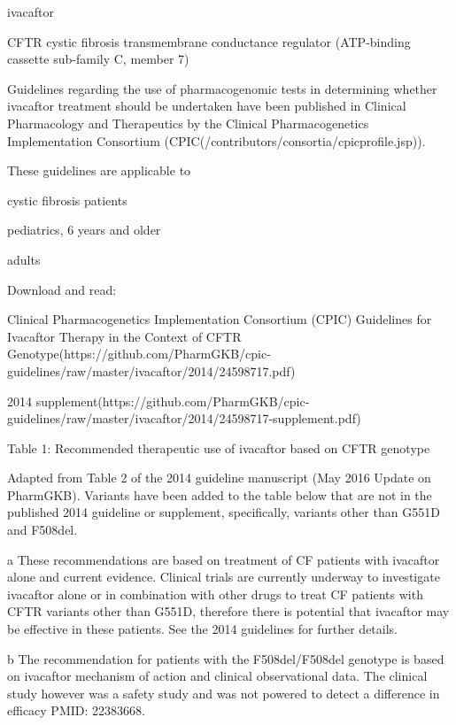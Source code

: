 \documentclass{resume} %
\begin{document}
\begin{rSection}{ ivacaftor }
\begin{rSubsection}{ CFTR }{ cystic fibrosis transmembrane conductance regulator (ATP-binding cassette sub-family C, member 7) }{}{}
 \newline
\item Guidelines regarding the use of pharmacogenomic tests in determining whether ivacaftor treatment should be undertaken have been published in Clinical Pharmacology and Therapeutics by the Clinical Pharmacogenetics Implementation Consortium (CPIC(/contributors/consortia/cpicprofile.jsp)). 
 \newline
\item These guidelines are applicable to 
 \newline
\item cystic fibrosis patients
 \newline
\item pediatrics, 6 years and older
 \newline
\item adults
 \newline
\item Download and read:
 \newline
\item Clinical Pharmacogenetics Implementation Consortium (CPIC) Guidelines for Ivacaftor Therapy in the Context of CFTR Genotype(https://github.com/PharmGKB/cpic-guidelines/raw/master/ivacaftor/2014/24598717.pdf) 
 \newline
\item 2014 supplement(https://github.com/PharmGKB/cpic-guidelines/raw/master/ivacaftor/2014/24598717-supplement.pdf)
 \newline
\item Table 1: Recommended therapeutic use of ivacaftor based on CFTR genotype
 \newline
\item Adapted from Table 2 of the 2014 guideline manuscript (May 2016 Update on PharmGKB).  Variants have been added to the table below that are not in the published 2014 guideline or supplement,  specifically, variants other than G551D and F508del.
 \newline
\item a These recommendations are based on treatment of CF patients with ivacaftor alone and current evidence. Clinical trials are currently underway to investigate ivacaftor alone or in combination with other drugs to treat CF patients with CFTR variants other than G551D, therefore there is potential that ivacaftor may be effective in these patients. See the 2014 guidelines for further details.
 \newline
\item b The recommendation for patients with the F508del/F508del genotype is based on ivacaftor mechanism of action and clinical observational data. The clinical study however was a safety study and was not powered to detect a difference in efficacy PMID: 22383668.

\end{rSubsection}
\end{rSection}
\end{document}
